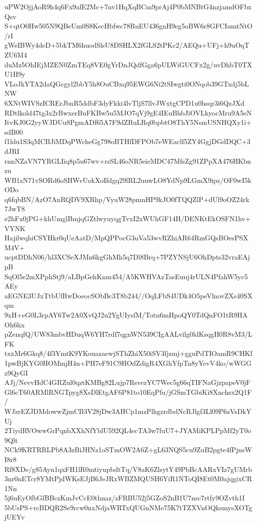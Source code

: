 uPW2OjjAoR9h4q6Fx9afE2Mc+7nv1HqXqBCm9prAj4P0bMNBtG4nzjamdOFbxQsv
S+qtO0Hw505N9QBeUm0S8KecHbfwc78RuEU436gnH9eg5oBW6r8GFCIumtNtO/rI
gWeIBWy4deD+5bkTM6huodSlsU8DSHLX2fGLS2tPKc2/AEQu+UFj+h9uOqTZU6M4
duMz5OhIEjMZEN0ZmTEq8VE0gYrDnJQdfGga6pULWiGUCFx2g/uvDhbT0TXU1H9y
VLoJkYTA2daQGcgyl2bbY5h8OuCBxq95EWG6Ni2tSIwgti0ONqob39GTxdj5bLNW
6XNtWIVSzICRErJbnR5ddbF3dyFkki4lvTljS7llvJWxtgCPD1u0hsqr3i6QzJXd
RDtlkold47tg3x2rBwxerBuFKBw5u5MJO7qVj9gE4IEuBhbJiOVLkyocMru9A5eN
ItvKJ0G2yyWJDUu8PgmADf65A7F9dZRuLRq0bpbtO8ThY5NsmUSNHQXy1i+sdB00
f1ldu1S3qMCBJiMDqPWcheGg798oBTHfDFPOb7eWEaclf5ZY4GgjDGdDQC+3dJRI
rnnNZaVN7YRGLIiq8p5u67wv+rsSL46oNR5eieMDC47MfsZg91ZPpXA476HKbnzu
WB1zN71vSORd6oSHWvUokXoIfdgq29lRL2uuwLO8YdNp9LGmX9ipz/OF0wI5kODo
q6fqbBN/AzO7AnRQDV9XRhp/VyuW28pmnHP9kJO0fTQQZlP+dUl9oOZ24rk7JwT8
e2hFx0jPG+khUmglBmjqGZtlwyuyqgTvxI2xWUhGF14H/DENKtEkOSFN1hv+VYNK
HajilwqhiCSYHkr0qUeAatD/MpQPPocG3uVa53wvRZhiAR64RmGQsBOesPSXM4V+
ucptDDhN06/hl3XCSeXJMn6kgGhMh5q7Dl8Brq+7PZYNSjU6OhDpts32vraEAjpB
SqOl5e2mXPphStj9/aLBpGehKnm454/A5KWHVAzTasEuuj4rULN4PfahW5yc5AEy
aEGNE3UJxTtbUfRwDoeocSObBc3T8b244//OqLFbS4UDk4O5peVlnovZXs40SXqm
9xH+eG0L3rpAY6Tw2A0XvQJ2u2YgUIysfM/Totn6mHpoQY0TdQnFO1tR9HAOh6hx
pZenqfQ/UW83mbvHDuqW6YH7rdf7qgnWN539CIgAALvilg0ldKsqgH0R8vM3/LFK
txxMr6Gkq8/4f3YmtK9YKouazaewjSThZhiX50iSV3fjzmj+gguPdTIOamR9CHKf
1pwBjKYG0HOMmjH4n+PH7eF91C9HOdZdigR4XGhYfpTn8yYevV4ko/wWGGz9QyGI
AJj/NevvHdC4GRZul0qztKMBg82Lujp7RsvezYC7Wec5g66qTIFNaGjzpapeV0jF
Gl6cT60ARMlRNGTpyg8XsDlEtgAF6P81to10EqPfu/jGSmTGbiKi8Xnchsx2Q1F/
WJzrEZJDMdowwZjmCB3V28jDw3AHCp1mzPlhgzrdbdNcRJlgf3Ll09P6zVsDkYUj
2TiydRVOwwGrPqnbXXhNfYblU592QL4ecTA3w7fuU7+JYAMiKPLPpMf2yT0o9Qlt
NCk9KRTRRLPb8A3zBiJHNz1oSTmOW2A6Z+gL63NQS5cu9ZuB2pgte4fPjnsWI8r8
Rf8XDe/g85Ayn1qxFH1lR0mtiyupbdtTq/V8aK6ZlsytY49PbBcAARxVIz7gUMrb
3nr0nETcr8YMtPjdWKsEJjB6JeJRxWBZMQUSH6YiR1NToQI8Et0M0ajqgixCR1Nn
5j6uEyOfbGfBBczKmJvCcE0thnaz/zFRBU52j5GZoS2nB1U7nsc7rtfy9OZvth1I
5bUsPS+rcBDQR2Se9rcw0nxNdjaWRTxQUGnNMe75K7tTZXVnOQksmysXOTgjUEYv

